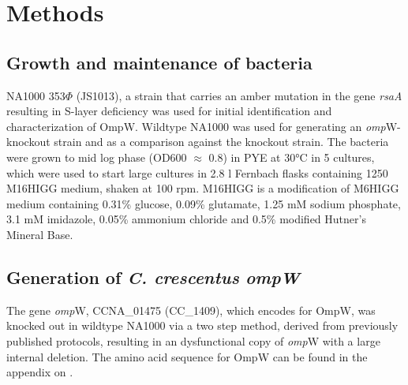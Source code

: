 \section{Methods}
\label{sec:porin_methods}
\subsection{Growth and maintenance of bacteria} 
\label{sub:porin_growth}
\caulobacter NA1000 353$\Phi$ (JS1013), a strain that carries an amber mutation in the gene \textit{rsaA} resulting in S-layer deficiency was used for initial identification and characterization of OmpW. Wildtype \caulobacter NA1000 was used for generating an \textit{omp}W-knockout strain and as a comparison against the knockout strain. The bacteria were  grown to mid log phase (\ac{OD600} $\approx$ 0.8) in \ac{PYE} at 30\si{\degreeCelsius} in 5 \millilitre cultures, which were used to start large cultures in 2.8 \si{\litre} Fernbach flasks containing 1250 \millilitre M16HIGG medium, shaken at 100 rpm. M16HIGG is a modification of M6HIGG medium containing 0.31\% glucose, 0.09\% glutamate, 1.25 mM sodium phosphate, 3.1 mM imidazole, 0.05\% ammonium chloride and 0.5\% modified Hutner's Mineral Base.

\subsection{Generation of \textit{C. crescentus} \del \textit{ompW}}
\label{sub:porin_knockout}
The gene \textit{omp}W, CCNA\_01475 (CC\_1409), which encodes for OmpW, was knocked out in wildtype \caulobacter NA1000 via a two step method, derived from previously published protocols, resulting in an dysfunctional copy of \textit{omp}W with a large internal deletion. The amino acid sequence for OmpW can be found in the appendix on .

